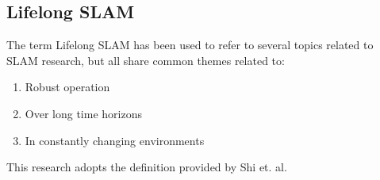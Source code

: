 \subsection{Lifelong SLAM}

The term Lifelong SLAM has been used to refer to several topics related to SLAM research, but all share common themes related to:
\begin{singlespace}
    \begin{enumerate}
        \item Robust operation
        \item Over long time horizons
        \item In constantly changing environments
    \end{enumerate}
\end{singlespace}
This research adopts the definition provided by Shi et. al.